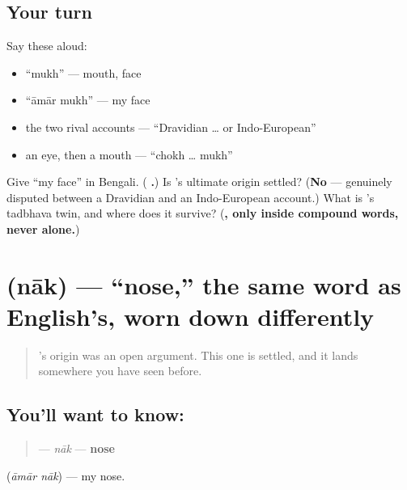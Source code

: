 \subsection*{Your turn}
Say these aloud:

\begin{itemize}
\raggedright
  \item \textquotedblleft{}mukh\textquotedblright{} — mouth, face
  \item \textquotedblleft{}āmār mukh\textquotedblright{} — my face
  \item the two rival accounts — \textquotedblleft{}Dravidian … or Indo-European\textquotedblright{}
  \item an eye, then a mouth — \textquotedblleft{}chokh … mukh\textquotedblright{}
\end{itemize}

\begin{tcolorbox}[breakable,colback=teal!4,colframe=teal!35!black,title={Before you move on}]
Give \textquotedblleft{}my face\textquotedblright{} in Bengali. (\textbf{ .}) Is 's ultimate origin settled? (\textbf{No} — genuinely disputed between a Dravidian and an Indo-European account.) What is 's tadbhava twin, and where does it survive? (\textbf{, only inside compound words, never alone.})
\end{tcolorbox}
\section[\texorpdfstring{\bn{নাক} (nāk)}{নাক (nāk)}]{ (nāk) — \textquotedblleft{}nose,\textquotedblright{} the same word as English's, worn down differently}

\label{lesson:BN-C12-nak}



\begin{quote}
's origin was an open argument. This one is settled, and it lands somewhere you have seen before.
\end{quote}

\subsection*{You'll want to know: }
\begin{quote}
\textbf{} — \emph{nāk} — \textbf{nose}
\end{quote}

\textbf{ } (\emph{āmār nāk}) — my nose.

